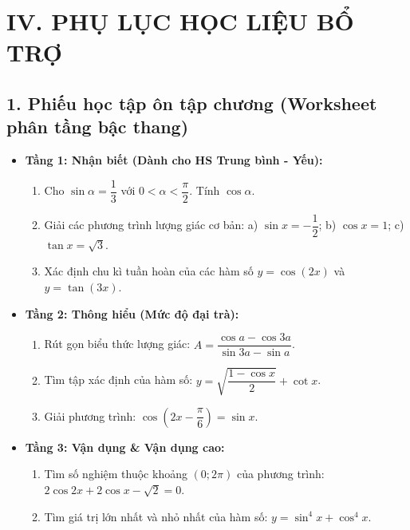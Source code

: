 \documentclass[12pt, a4paper]{article}
\begin{document}
\section*{IV. PHỤ LỤC HỌC LIỆU BỔ TRỢ}  
  
\subsection*{1. Phiếu học tập ôn tập chương (Worksheet phân tầng bậc thang)}  
  
\begin{itemize}[leftmargin=0.6cm]  
    \item \textbf{Tầng 1: Nhận biết (Dành cho HS Trung bình - Yếu):}  
    \begin{enumerate}  
        \item Cho $\sin\alpha = \dfrac{1}{3}$ với $0 < \alpha < \dfrac{\pi}{2}$. Tính $\cos\alpha$.  
        \item Giải các phương trình lượng giác cơ bản: a) $\sin x = -\dfrac{1}{2}$; \quad b) $\cos x = 1$; \quad c) $\tan x = \sqrt{3}$.  
        \item Xác định chu kì tuần hoàn của các hàm số $y = \cos(2x)$ và $y = \tan(3x)$.  
    \end{enumerate}  
  
    \item \textbf{Tầng 2: Thông hiểu (Mức độ đại trà):}  
    \begin{enumerate}  
        \item Rút gọn biểu thức lượng giác: $A = \dfrac{\cos a - \cos 3a}{\sin 3a - \sin a}$.  
        \item Tìm tập xác định của hàm số: $y = \sqrt{\dfrac{1 - \cos x}{2}} + \cot x$.  
        \item Giải phương trình: $\cos\left(2x - \dfrac{\pi}{6}\right) = \sin x$.  
    \end{enumerate}  
  
    \item \textbf{Tầng 3: Vận dụng \& Vận dụng cao:}  
    \begin{enumerate}  
        \item Tìm số nghiệm thuộc khoảng $(0; 2\pi)$ của phương trình: $2\cos 2x + 2\cos x - \sqrt{2} = 0$.  
        \item Tìm giá trị lớn nhất và nhỏ nhất của hàm số: $y = \sin^4 x + \cos^4 x$.  
    \end{enumerate}  
\end{itemize}  
  
\end{document}

